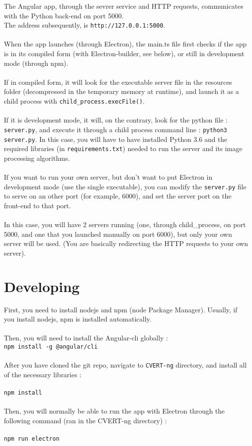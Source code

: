 \documentclass[12pt,a4paper]{article}
\begin{document}
The Angular app, through the sevrer service and HTTP requests, communicates with the Python back-end on port 5000.\\
The address subsequently, is \texttt{http://127.0.0.1:5000}.\\
~\\
When the app launches (through Electron), the main.ts file first checks if the app is in its compiled form (with Electron-builder, see below), or still in development mode (through npm).\\
~\\
If in compiled form, it will look for the executable server file in the resources folder (decompressed in the temporary memory at runtime), and launch it as a child process with \texttt{child\_process.execFile()}.\\
~\\
If it is development mode, it will, on the contrary, look for the python file : \texttt{server.py}, and execute it through a child process command line : \texttt{python3 server.py}. In this case, you will have to have installed Python 3.6 and the required libraries (in \texttt{requirements.txt}) needed to run the server and its image processing algorithms.\\
~\\
If you want to run your own server, but don't want to put Electron in development mode (use the single executable), you can modify the \texttt{server.py} file to serve on an other port (for example, 6000), and set the server port on the front-end to that port.\\
~\\
In this case, you will have 2 servers running (one, through child\_process, on port 5000, and one that you launched manually on port 6000), but only your own server will be used. (You are basically redirecting the HTTP requests to your own server).

\section{Developing}

First, you need to install nodejs and npm (node Package Manager). Usually, if you install nodejs, npm is installed automatically.\\
~\\
Then, you will need to install the Angular-cli globally :\\
\texttt{npm install -g @angular/cli}\\
~\\
After you have cloned the git repo, navigate to \texttt{CVERT-ng} directory, and install all of the necessary libraries :\\
~\\
\texttt{npm install}\\
~\\
Then, you will normally be able to run the app with Electron through the following command (ran in the CVERT-ng directory) :\\
~\\
\texttt{npm run electron}
\end{document}
